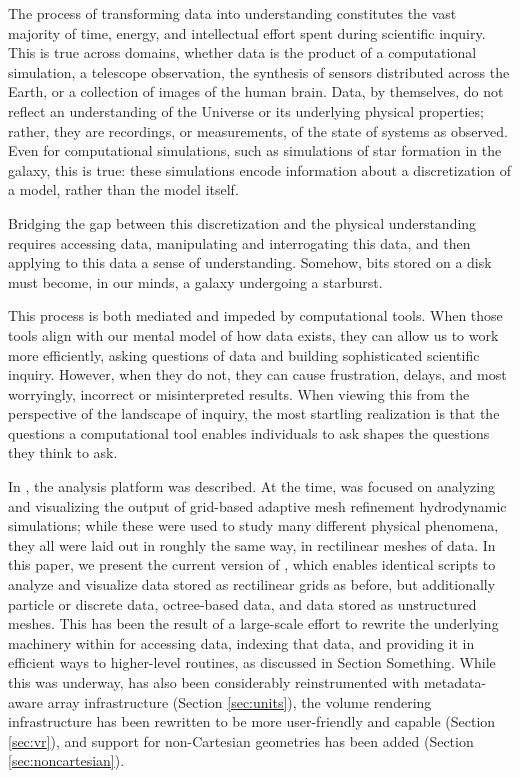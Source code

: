 The process of transforming data into understanding constitutes the vast
majority of time, energy, and intellectual effort spent during scientific
inquiry.  This is true across domains, whether data is the product of a
computational simulation, a telescope observation, the synthesis of sensors
distributed across the Earth, or a collection of images of the human brain.
Data, by themselves, do not reflect an understanding of the Universe or its
underlying physical properties; rather, they are recordings, or measurements,
of the state of systems as observed.  Even for computational simulations, such
as simulations of star formation in the galaxy, this is true: these simulations
encode information about a discretization of a model, rather than the model
itself.

Bridging the gap between this discretization and the physical understanding
requires accessing data, manipulating and interrogating this data, and then
applying to this data a sense of understanding.  Somehow, bits stored on a disk
must become, in our minds, a galaxy undergoing a starburst.

This process is both mediated and impeded by computational tools.  When those
tools align with our mental model of how data exists, they can allow us to work
more efficiently, asking questions of data and building sophisticated
scientific inquiry.  However, when they do not, they can cause frustration,
delays, and most worryingly, incorrect or misinterpreted results.  When viewing
this from the perspective of the landscape of inquiry, the most startling
realization is that the questions a computational tool enables
individuals to ask shapes the questions they think to ask.

In \cite{yt_method_paper}, the analysis platform \yt{} was described.  At the
time, \yt{} was focused on analyzing and visualizing the output of grid-based
adaptive mesh refinement hydrodynamic simulations; while these were used to
study many different physical phenomena, they all were laid out in roughly the
same way, in rectilinear meshes of data.  In this paper, we present the current
version of \yt{}, which enables identical scripts to analyze and visualize data
stored as rectilinear grids as before, but additionally particle or discrete
data, octree-based data, and data stored as unstructured meshes.  This has been
the result of a large-scale effort to rewrite the underlying machinery within
\yt{} for accessing data, indexing that data, and providing it in efficient
ways to higher-level routines, as discussed in Section Something.  While this
was underway, \yt{} has also been considerably reinstrumented with
metadata-aware array infrastructure (Section \ref{sec:units}),
the volume rendering infrastructure has been rewritten to be more user-friendly
and capable (Section \ref{sec:vr}), and support for non-Cartesian geometries has
been added (Section \ref{sec:noncartesian}).

